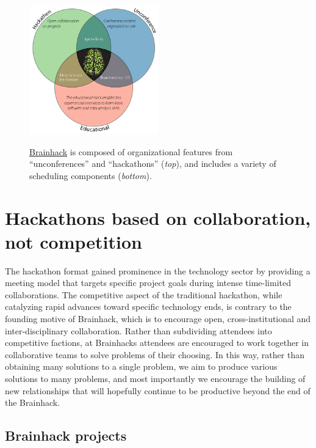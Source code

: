 \documentclass[11pt]{bmc_article_s50}
\begin{document}
\begin{figure}[htp]
\begin{center}
  \includegraphics[width=0.5\textwidth]{Figure_01}\label{fig1}
  \caption{\href{http://www.brainhack.org}{Brainhack} is composed of organizational features from ``unconferences'' and ``hackathons'' (\emph{top}), and includes a variety of scheduling components (\emph{bottom}).}
\end{center}
\end{figure}

\section{Hackathons based on collaboration, not competition}\label{hackathons-based-on-collaboration-not-competition}

The hackathon format gained prominence in the technology sector by providing a meeting model that targets specific project goals during intense time-limited collaborations. The competitive aspect of the traditional hackathon, while catalyzing rapid advances toward specific technology ends, is contrary to the founding motive of Brainhack, which is to encourage open, cross-institutional and inter-disciplinary collaboration. Rather than subdividing attendees into competitive factions, at Brainhacks attendees are encouraged to work together in collaborative teams to solve problems of their choosing. In this way, rather than obtaining many solutions to a single problem, we aim to produce various solutions to many problems, and most importantly we encourage the building of new relationships that will hopefully continue to be productive beyond the end of the Brainhack.

\subsection{Brainhack projects}
\end{document}
